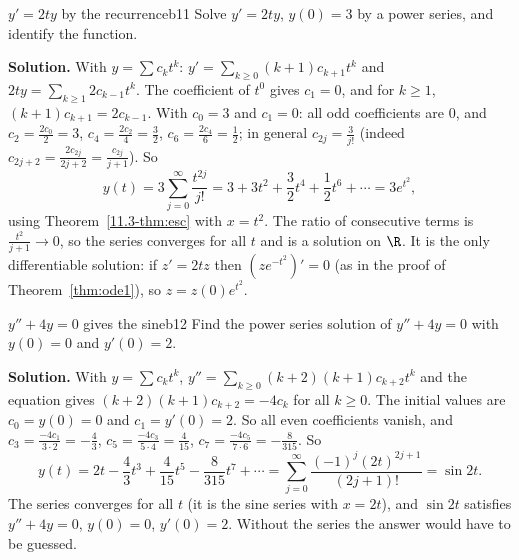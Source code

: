 \documentclass[11pt]{article}
\begin{document}
\begin{exmp}{$y'=2ty$ by the recurrence}{b11}
Solve $y'=2ty$, $y(0)=3$ by a power series, and identify the function.

\textbf{Solution.} With $y=\sum c_kt^k$: $y'=\sum_{k\ge0}(k+1)c_{k+1}t^k$ and $2ty=\sum_{k\ge1}2c_{k-1}t^k$. The coefficient of $t^0$ gives $c_1=0$, and for $k\ge1$, $(k+1)c_{k+1}=2c_{k-1}$. With $c_0=3$ and $c_1=0$: all odd coefficients are $0$, and $c_2=\frac{2c_0}2=3$, $c_4=\frac{2c_2}4=\frac32$, $c_6=\frac{2c_4}6=\frac12$; in general $c_{2j}=\frac3{j!}$ (indeed $c_{2j+2}=\frac{2c_{2j}}{2j+2}=\frac{c_{2j}}{j+1}$). So
\[
y(t)=3\sum_{j=0}^\infty\frac{t^{2j}}{j!}=3+3t^2+\frac32t^4+\frac12t^6+\cdots=3e^{t^2},
\]
using Theorem~\ref{11.3-thm:esc} with $x=t^2$. The ratio of consecutive terms is $\frac{t^2}{j+1}\to0$, so the series converges for all $t$ and is a solution on $\R$. It is the only differentiable solution: if $z'=2tz$ then $\left(ze^{-t^2}\right)'=0$ (as in the proof of Theorem~\ref{thm:ode1}), so $z=z(0)e^{t^2}$.
\end{exmp}

\begin{exmp}{$y''+4y=0$ gives the sine}{b12}
Find the power series solution of $y''+4y=0$ with $y(0)=0$ and $y'(0)=2$.

\textbf{Solution.} With $y=\sum c_kt^k$, $y''=\sum_{k\ge0}(k+2)(k+1)c_{k+2}t^k$ and the equation gives $(k+2)(k+1)c_{k+2}=-4c_k$ for all $k\ge0$. The initial values are $c_0=y(0)=0$ and $c_1=y'(0)=2$. So all even coefficients vanish, and $c_3=\frac{-4c_1}{3\cdot2}=-\frac43$, $c_5=\frac{-4c_3}{5\cdot4}=\frac4{15}$, $c_7=\frac{-4c_5}{7\cdot6}=-\frac8{315}$. So
\[
y(t)=2t-\frac43t^3+\frac4{15}t^5-\frac8{315}t^7+\cdots=\sum_{j=0}^\infty\frac{(-1)^j(2t)^{2j+1}}{(2j+1)!}=\sin2t .
\]
The series converges for all $t$ (it is the sine series with $x=2t$), and $\sin2t$ satisfies $y''+4y=0$, $y(0)=0$, $y'(0)=2$. Without the series the answer would have to be guessed.
\end{exmp}
\end{document}
